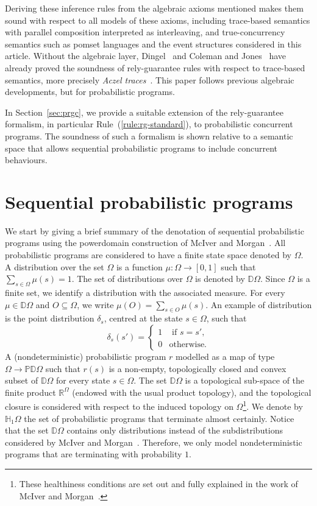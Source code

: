 \documentclass[review]{elsart}
\newcommand{\Real}{{\mathbb R}}
\newcommand{\D}{\mathbb{D}}
\renewcommand{\H}{\mathbb{H}}
\renewcommand{\P}{\mathbb{P}}
\begin{document}
Deriving these inference rules from the algebraic axioms mentioned makes them sound with respect to all models of these axioms, including trace-based semantics with parallel composition interpreted as interleaving, and true-concurrency semantics such as pomset languages and the event structures considered in this article. Without the algebraic layer, Dingel~\cite{Din02} and Coleman and Jones~\cite{Col07} have already proved the soundness of rely-guarantee rules with respect to trace-based semantics, more precisely \emph{Aczel traces}~\cite{Roe97}.  This paper follows previous algebraic developments, but for probabilistic programs.

In Section~\ref{sec:prgc}, we provide a suitable extension of the rely-guarantee formalism, in particular Rule~(\ref{rule:rg-standard}), to probabilistic concurrent programs. The soundness of such a formalism is shown relative to a semantic space that allows sequential probabilistic programs to include concurrent behaviours.

\section{Sequential probabilistic programs}\label{sec:sequential-programs}
We start by giving a brief summary of the denotation of sequential probabilistic programs using the powerdomain construction of McIver and Morgan~\cite{Mci04}. All probabilistic programs are considered to have a finite state space denoted by $\Omega$. A distribution over the set $\Omega$ is a function $\mu{:}\Omega{\to}[0,1]$ such that $\sum_{s{\in}\Omega}\mu(s) {=} 1$. The set of distributions over $\Omega$ is denoted by $\D\Omega$. Since $\Omega$ is a finite set, we identify a distribution with the associated measure. For every $\mu{\in}\D\Omega$ and $O{\subseteq}\Omega$, we write $\mu(O) {=} \sum_{s{\in} O}\mu(s)$. An example of distribution is the point distribution $\delta_s$, centred at the state $s{\in}\Omega$, such that
\begin{displaymath}
\delta_s(s') = \begin{cases}
1 & \textrm{ if } s {=} s',\\
0 & \textrm{otherwise.}
\end{cases}
\end{displaymath}
A (nondeterministic) probabilistic program $r$ modelled as a map of type $\Omega{\to}\P\D \Omega$ such that $r(s)$ is a non-empty, topologically closed and convex subset of $\D \Omega$ for every state $s{\in} \Omega$. The set $\D\Omega$ is a topological sub-space of the finite product $\Real^\Omega$ (endowed with the usual product topology), and the topological closure is considered with respect to the induced topology on $\Omega$\footnote{These healthiness conditions are set out and fully explained in the work of McIver and Morgan~\cite{Mci04}.}. We denote by $\H_1 \Omega $ the set of probabilistic programs that terminate almost certainly. Notice that the set $\D\Omega$ contains only distributions instead of the subdistributions considered by McIver and Morgan~\cite{Mci04}. Therefore, we only model nondeterministic programs that are terminating with probability $1$.
\end{document}
